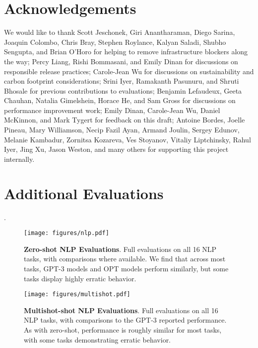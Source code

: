 \documentclass[11pt]{article}
\begin{document}
 
\section*{Acknowledgements}
We would like to thank Scott Jeschonek, Giri Anantharaman, Diego Sarina, Joaquin Colombo, Chris Bray, Stephen Roylance, Kalyan Saladi, Shubho Sengupta, and Brian O'Horo for helping to remove infrastructure blockers along the way; Percy Liang, Rishi Bommasani, and Emily Dinan for discussions on responsible release practices; Carole-Jean Wu for discussions on sustainability and carbon footprint considerations; Srini Iyer, Ramakanth Pasunuru, and Shruti Bhosale for previous contributions to evaluations; Benjamin Lefaudeux, Geeta Chauhan, Natalia Gimelshein, Horace He, and Sam Gross for discussions on performance improvement work; Emily Dinan, Carole-Jean Wu, Daniel McKinnon, and Mark Tygert for feedback on this draft; Antoine Bordes, Joelle Pineau, Mary Williamson, Necip Fazil Ayan, Armand Joulin, Sergey Edunov, Melanie Kambadur, Zornitsa Kozareva, Ves Stoyanov, Vitaliy Liptchinsky, Rahul Iyer, Jing Xu, Jason Weston, and many others for supporting this project internally.




\clearpage
\appendix
\onecolumn

\section{Additional Evaluations}
\label{app:full_evals}.
\begin{figure}[h]
    \centering
    \texttt{[image: figures/nlp.pdf]}
    \caption{{\bf Zero-shot NLP Evaluations}. Full evaluations on all 16 NLP tasks, with comparisons where available. We find that across most tasks, GPT-3 models and OPT models perform similarly, but some tasks display highly erratic behavior.}
    \label{fig:full_nlp}
\end{figure}
\clearpage

\begin{figure}[h]
    \centering
    \texttt{[image: figures/multishot.pdf]}
    \caption{{\bf Multishot-shot NLP Evaluations}. Full evaluations on all 16 NLP tasks, with comparisons to the GPT-3 reported performance. As with zero-shot, performance is roughly similar for most tasks, with some tasks demonstrating erratic behavior.}
    \label{fig:full_nlp2}
\end{figure}
\clearpage 
\end{document}
